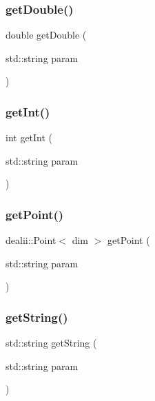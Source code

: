 \mbox{\label{classparameters_class_a40b9baa33a85fa60f5df2996d7dec98b}} 
\subsubsection{\texorpdfstring{get\+Double()}{getDouble()}}
{\footnotesize\ttfamily double get\+Double (\begin{DoxyParamCaption}\item[{std\+::string}]{param }\end{DoxyParamCaption})}

\mbox{\label{classparameters_class_aa97dc7db4ec450afd1cb8bd0d8e00d12}} 
\subsubsection{\texorpdfstring{get\+Int()}{getInt()}}
{\footnotesize\ttfamily int get\+Int (\begin{DoxyParamCaption}\item[{std\+::string}]{param }\end{DoxyParamCaption})}

\mbox{\label{classparameters_class_ab98c50b2209c80346a3e6efdd71589b5}} 
\subsubsection{\texorpdfstring{get\+Point()}{getPoint()}}
{\footnotesize\ttfamily dealii\+::\+Point$<$ dim $>$ get\+Point (\begin{DoxyParamCaption}\item[{std\+::string}]{param }\end{DoxyParamCaption})}

\mbox{\label{classparameters_class_a988c0deb4c2cf7e8ed80e39498c1eb58}} 
\subsubsection{\texorpdfstring{get\+String()}{getString()}}
{\footnotesize\ttfamily std\+::string get\+String (\begin{DoxyParamCaption}\item[{std\+::string}]{param }\end{DoxyParamCaption})}

